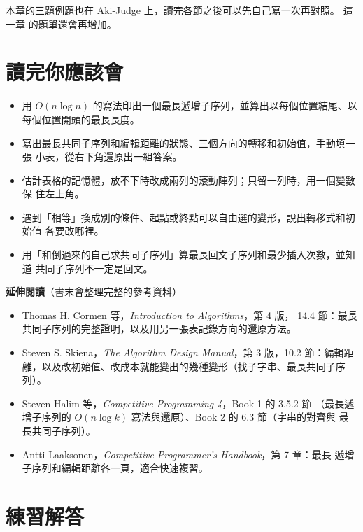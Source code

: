 本章的三題例題也在 Aki-Judge 上，讀完各節之後可以先自己寫一次再對照。 這一章
的題單還會再增加。

\section{讀完你應該會}
\label{sec:ss-checklist}

\begin{itemize}
\item 用 $O(n \log n)$ 的寫法印出一個最長遞增子序列，並算出以每個位置結尾、以
每個位置開頭的最長長度。
\item 寫出最長共同子序列和編輯距離的狀態、三個方向的轉移和初始值，手動填一張
小表，從右下角還原出一組答案。
\item 估計表格的記憶體，放不下時改成兩列的滾動陣列；只留一列時，用一個變數保
住左上角。
\item 遇到「相等」換成別的條件、起點或終點可以自由選的變形，說出轉移式和初始值
各要改哪裡。
\item 用「和倒過來的自己求共同子序列」算最長回文子序列和最少插入次數，並知道
共同子序列不一定是回文。
\end{itemize}

\textbf{延伸閱讀}（書末會整理完整的參考資料）

\begin{itemize}
\item Thomas H. Cormen 等，\textit{Introduction to Algorithms}，第 4 版，
14.4 節：最長共同子序列的完整證明，以及用另一張表記錄方向的還原方法。
\item Steven S. Skiena，\textit{The Algorithm Design Manual}，第 3 版，10.2
節：編輯距離，以及改初始值、改成本就能變出的幾種變形（找子字串、最長共同子序
列）。
\item Steven Halim 等，\textit{Competitive Programming 4}，Book 1 的 3.5.2 節
（最長遞增子序列的 $O(n \log k)$ 寫法與還原）、Book 2 的 6.3 節（字串的對齊與
最長共同子序列）。
\item Antti Laaksonen，\textit{Competitive Programmer's Handbook}，第 7 章：最長
遞增子序列和編輯距離各一頁，適合快速複習。
\end{itemize}

\section*{練習解答}

